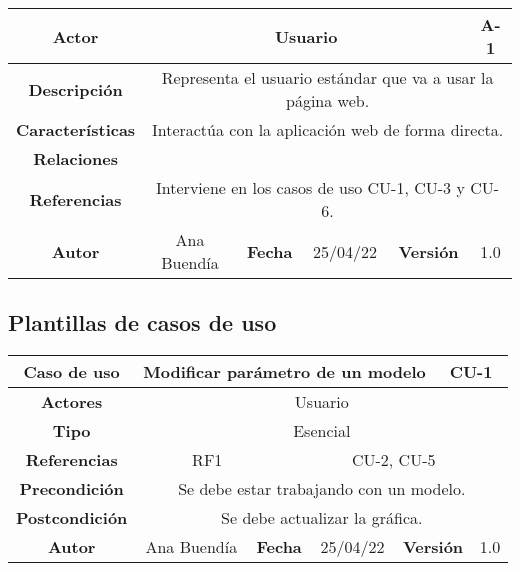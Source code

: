 \begin{table}[!h]
\begin{tabular}{|c|c|c|c|c|c|c|c|}
\hline
 \rowcolor{cyan} \textbf{Actor} & \multicolumn{6}{|c|}{Usuario} & {A-1} \\
\hline
 \cellcolor{cyan} \textbf{Descripción}              & \multicolumn{7}{|c|}{Representa el usuario estándar que va a usar la página web.}           \\
\hline
 \cellcolor{cyan} \textbf{Características}                 & \multicolumn{7}{|c|}{Interactúa con la aplicación web de forma directa.}             \\
\hline
 \cellcolor{cyan} \textbf{Relaciones}         & \multicolumn{7}{|c|}{}             \\
\hline
\cellcolor{cyan} \textbf{Referencias}        & \multicolumn{7}{|c|}{Interviene en los casos de uso CU-1, CU-3 y CU-6.}              \\
\hline
\cellcolor{cyan} \textbf{Autor}                &   Ana Buendía  & \multicolumn{2}{|c|}{\cellcolor{cyan} \textbf{Fecha}} &  25/04/22   & \multicolumn{2}{|c|}{\cellcolor{cyan} \textbf{Versión}} & 1.0  \\
\hline
\end{tabular}
\end{table}



\clearpage

\subsection{Plantillas de casos de uso}



\begin{table}[!h]
\begin{tabular}{|c|c|c|c|c|c|c|c|}
\hline
\rowcolor{cyan} \textbf{Caso de uso} & \multicolumn{5}{|c|}{Modificar parámetro de un modelo} & \multicolumn{2}{|c|}{CU-1} \\
\hline
\cellcolor{cyan} \textbf{Actores}              & \multicolumn{7}{|c|}{Usuario}           \\
\hline
\cellcolor{cyan} \textbf{Tipo}                 & \multicolumn{7}{|c|}{Esencial}             \\
\hline
\cellcolor{cyan} \textbf{Referencias}          & \multicolumn{2}{|c|}{RF1}           & \multicolumn{5}{|c|}{CU-2, CU-5}\\
\hline
\cellcolor{cyan} \textbf{Precondición}         & \multicolumn{7}{|c|}{Se debe estar trabajando con un modelo.}             \\
\hline
\cellcolor{cyan} \textbf{Postcondición}        & \multicolumn{7}{|c|}{Se debe actualizar la gráfica.}              \\
\hline
\cellcolor{cyan} \textbf{Autor}                &   Ana Buendía  & \multicolumn{2}{|c|}{\cellcolor{cyan} \textbf{Fecha}} &  25/04/22   & \multicolumn{2}{|c|}{\cellcolor{cyan} \textbf{Versión}} & 1.0  \\
\hline
\end{tabular}
\end{table}

